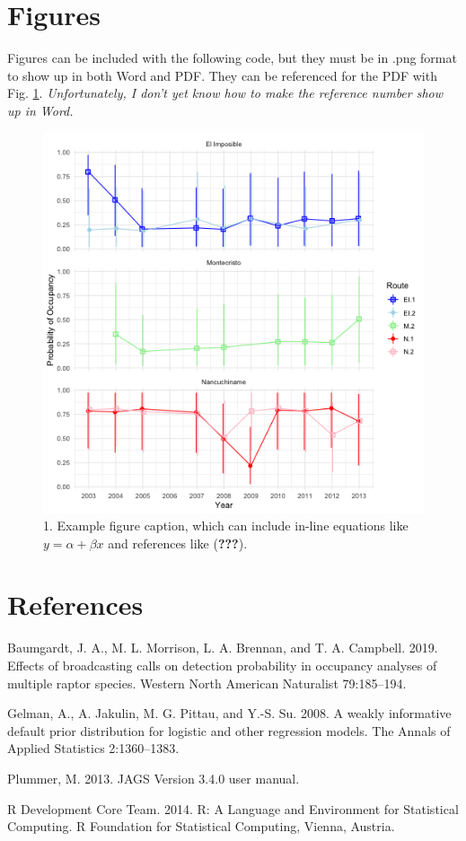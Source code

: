 \documentclass[]{article}
\begin{document}
\section{Figures}\label{figures}

Figures can be included with the following code, but they must be in
.png format to show up in both Word and PDF. They can be referenced for
the PDF with Fig. \ref{figure1}. \emph{Unfortunately, I don't yet know
how to make the reference number show up in Word.}

\begin{figure}[htbp]
\centering
\includegraphics{../output/figures/ferpy_psi_byYr-1.png}
\caption{1. Example figure caption, which can include in-line equations
like \(y = \alpha + \beta x\) and references like ({\textbf{???}}).
\label{figure1}}
\end{figure}

\section*{References}\label{references}

\hypertarget{refs}{}
\hypertarget{ref-Baumgardt:2019}{}
Baumgardt, J. A., M. L. Morrison, L. A. Brennan, and T. A. Campbell.
2019. Effects of broadcasting calls on detection probability in
occupancy analyses of multiple raptor species. Western North American
Naturalist 79:185--194.

\hypertarget{ref-Gelman:2008}{}
Gelman, A., A. Jakulin, M. G. Pittau, and Y.-S. Su. 2008. A weakly
informative default prior distribution for logistic and other regression
models. The Annals of Applied Statistics 2:1360--1383.

\hypertarget{ref-Plummer:2013}{}
Plummer, M. 2013. JAGS Version 3.4.0 user manual.

\hypertarget{ref-R:2014}{}
R Development Core Team. 2014. R: A Language and Environment for
Statistical Computing. R Foundation for Statistical Computing, Vienna,
Austria.
\end{document}
